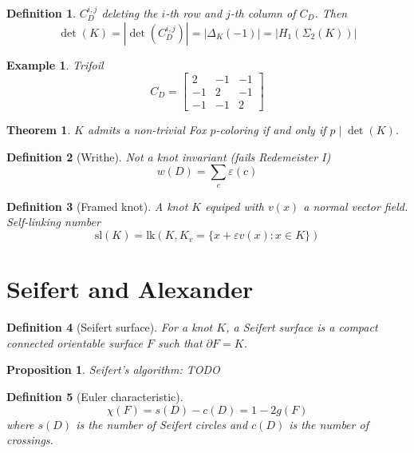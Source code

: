 \documentclass[leqno]{article}
\newtheorem*{theorem}{Theorem}
\newtheorem*{proposition}{Proposition}
\newtheorem*{definition}{Definition}
\newtheorem*{example}{Example}
\begin{document}

\begin{definition} $C_D^{i,j}$ deleting the $i$-th row and $j$-th column of $C_D$. Then
\[
\det (K) = \left| \det (C_D^{i,j}) \right|  = \left| \Delta_K(-1) \right| = \left| H_1(\Sigma_2(K)) \right|
\]
\end{definition}

\begin{example} Trifoil
\[
C_D = \begin{bmatrix}2 & -1 & -1 \\
-1 & 2 & -1 \\
-1 & -1 & 2 \end{bmatrix}
\]
\end{example}

\begin{theorem} $K$ admits a non-trivial Fox $p$-coloring if and only if $p \mid \det (K)$.
\end{theorem}

\begin{definition}[Writhe] Not a knot invariant (fails Redemeister I)
\[
w(D) = \sum_{c} \varepsilon(c)
\]
\end{definition}

\begin{definition}[Framed knot] A knot $K$ equiped with $v(x)$ a normal vector field. Self-linking number
\[
\text{sl}(K) = \text{lk}(K, K_v = \{x + \varepsilon v(x) : x \in K\})
\]
\end{definition}

\section{Seifert and Alexander}

\begin{definition}[Seifert surface] For a knot $K$, a Seifert surface is a compact connected orientable surface $F$ such that $\partial F = K$.
\end{definition}

\begin{proposition} Seifert's algorithm:
TODO
\end{proposition}

\begin{definition}[Euler characteristic]
\[
\chi(F) = s(D) - c(D) = 1 - 2g(F)
\]
where $s(D)$ is the number of Seifert circles and $c(D)$ is the number of crossings.
\end{definition}
\end{document}

